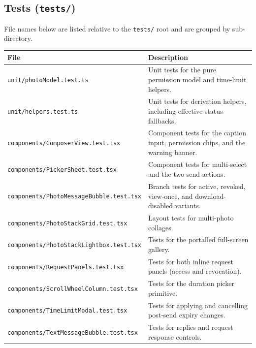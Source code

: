 \subsection*{Tests (\texttt{tests/})}

\noindent
File names below are listed relative to the \texttt{tests/} root and are grouped by sub-directory.

\begin{center}
\footnotesize
\begin{tabular}{@{}P{5.8cm}P{8.0cm}@{}}
\hline
\textbf{File} & \textbf{Description} \\
\hline
\texttt{unit/photoModel.test.ts} & Unit tests for the pure permission model and time-limit helpers. \\
\texttt{unit/helpers.test.ts} & Unit tests for derivation helpers, including effective-status fallbacks. \\
\texttt{components/ComposerView.\linebreak[0]test.tsx} & Component tests for the caption input, permission chips, and the warning banner. \\
\texttt{components/PickerSheet.\linebreak[0]test.tsx} & Component tests for multi-select and the two send actions. \\
\texttt{components/PhotoMessageBubble.\linebreak[0]test.tsx} & Branch tests for active, revoked, view-once, and download-disabled variants. \\
\texttt{components/PhotoStackGrid.\linebreak[0]test.tsx} & Layout tests for multi-photo collages. \\
\texttt{components/PhotoStackLightbox.\linebreak[0]test.tsx} & Tests for the portalled full-screen gallery. \\
\texttt{components/RequestPanels.\linebreak[0]test.tsx} & Tests for both inline request panels (access and revocation). \\
\texttt{components/ScrollWheelColumn.\linebreak[0]test.tsx} & Tests for the duration picker primitive. \\
\texttt{components/TimeLimitModal.\linebreak[0]test.tsx} & Tests for applying and cancelling post-send expiry changes. \\
\texttt{components/TextMessageBubble.\linebreak[0]test.tsx} & Tests for replies and request response controls. \\

\end{tabular}
\end{center}
